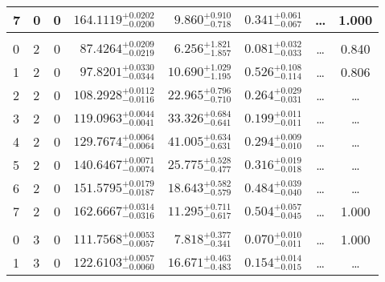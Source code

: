 \begin{table*}[!]
\begin{tabular}{llcrrlrc}
7 & 0 & 0 & $    164.1119_{-      0.0200}^{+      0.0202}$ & $       9.860_{-       0.718}^{+       0.910}$ & $       0.341_{-       0.067}^{+       0.061}$ & \multicolumn{1}{c}{\dots} & 1.000\\[1pt]
\hline \\[-8pt]
0 & 2 & 0 & $     87.4264_{-      0.0219}^{+      0.0209}$ & $       6.256_{-       1.857}^{+       1.821}$ & $       0.081_{-       0.033}^{+       0.032}$ & \multicolumn{1}{c}{\dots} & 0.840 \\[1pt]
1 & 2 & 0 & $     97.8201_{-      0.0344}^{+      0.0330}$ & $      10.690_{-       1.195}^{+       1.029}$ & $       0.526_{-       0.114}^{+       0.108}$ & \multicolumn{1}{c}{\dots} & 0.806\\[1pt]
2 & 2 & 0 & $    108.2928_{-      0.0116}^{+      0.0112}$ & $      22.965_{-       0.710}^{+       0.796}$ & $       0.264_{-       0.031}^{+       0.029}$ & \multicolumn{1}{c}{\dots} & \dots \\[1pt]
3 & 2 & 0 & $    119.0963_{-      0.0041}^{+      0.0044}$ & $      33.326_{-       0.641}^{+       0.684}$ & $       0.199_{-       0.011}^{+       0.011}$ & \multicolumn{1}{c}{\dots} & \dots \\[1pt]
4 & 2 & 0 & $    129.7674_{-      0.0064}^{+      0.0064}$ & $      41.005_{-       0.631}^{+       0.634}$ & $       0.294_{-       0.010}^{+       0.009}$ & \multicolumn{1}{c}{\dots} & \dots \\[1pt]
5 & 2 & 0 & $    140.6467_{-      0.0074}^{+      0.0071}$ & $      25.775_{-       0.477}^{+       0.528}$ & $       0.316_{-       0.018}^{+       0.019}$ & \multicolumn{1}{c}{\dots} & \dots \\[1pt]
6 & 2 & 0 & $    151.5795_{-      0.0187}^{+      0.0179}$ & $      18.643_{-       0.579}^{+       0.582}$ & $       0.484_{-       0.040}^{+       0.039}$ & \multicolumn{1}{c}{\dots} & \dots \\[1pt]
7 & 2 & 0 & $    162.6667_{-      0.0316}^{+      0.0314}$ & $      11.295_{-       0.617}^{+       0.711}$ & $       0.504_{-       0.045}^{+       0.057}$ & \multicolumn{1}{c}{\dots} & 1.000\\[1pt]
\hline \\[-8pt]
0 & 3 & 0 & $    111.7568_{-      0.0057}^{+      0.0053}$ & $       7.818_{-       0.341}^{+       0.377}$ & $       0.070_{-       0.011}^{+       0.010}$ & \multicolumn{1}{c}{\dots} & 1.000 \\[1pt]
1 & 3 & 0 & $    122.6103_{-      0.0060}^{+      0.0057}$ & $      16.671_{-       0.483}^{+       0.463}$ & $       0.154_{-       0.015}^{+       0.014}$ & \multicolumn{1}{c}{\dots} & \dots \\[1pt]

\end{tabular}
\end{table*}
